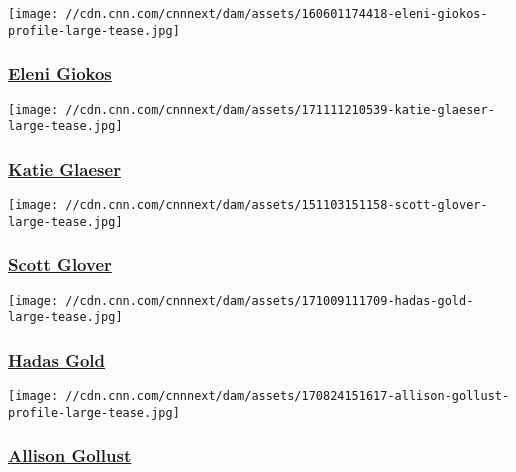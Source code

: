 \href{/profiles/eleni-giokos}{}

\texttt{[image: //cdn.cnn.com/cnnnext/dam/assets/160601174418-eleni-giokos-profile-large-tease.jpg]}

\hypertarget{eleni-giokos}{%
\subsubsection{\texorpdfstring{\href{/profiles/eleni-giokos}{Eleni
Giokos}}{Eleni Giokos}}\label{eleni-giokos}}

\href{/profiles/katie-glaeser}{}

\texttt{[image: //cdn.cnn.com/cnnnext/dam/assets/171111210539-katie-glaeser-large-tease.jpg]}

\hypertarget{katie-glaeser}{%
\subsubsection{\texorpdfstring{\href{/profiles/katie-glaeser}{Katie
Glaeser}}{Katie Glaeser}}\label{katie-glaeser}}

\href{/profiles/scott-glover}{}

\texttt{[image: //cdn.cnn.com/cnnnext/dam/assets/151103151158-scott-glover-large-tease.jpg]}

\hypertarget{scott-glover}{%
\subsubsection{\texorpdfstring{\href{/profiles/scott-glover}{Scott
Glover}}{Scott Glover}}\label{scott-glover}}

\href{/profiles/hadas-gold}{}

\texttt{[image: //cdn.cnn.com/cnnnext/dam/assets/171009111709-hadas-gold-large-tease.jpg]}

\hypertarget{hadas-gold}{%
\subsubsection{\texorpdfstring{\href{/profiles/hadas-gold}{Hadas
Gold}}{Hadas Gold}}\label{hadas-gold}}

\href{/profiles/allison-gollust-profile}{}

\texttt{[image: //cdn.cnn.com/cnnnext/dam/assets/170824151617-allison-gollust-profile-large-tease.jpg]}

\hypertarget{allison-gollust}{%
\subsubsection{\texorpdfstring{\href{/profiles/allison-gollust-profile}{Allison
Gollust}}{Allison Gollust}}\label{allison-gollust}}

